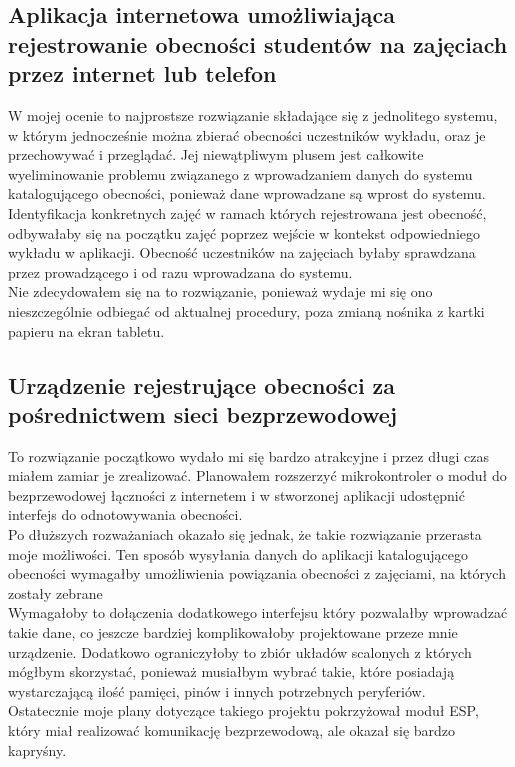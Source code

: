 \documentclass[declaration,shortabstract, mgr]{iithesis}
\begin{document}
\subsection{Aplikacja internetowa umożliwiająca rejestrowanie obecności studentów na zajęciach przez internet lub telefon}
\indent W mojej ocenie to najprostsze rozwiązanie składające się z jednolitego systemu, w którym jednocześnie można zbierać obecności uczestników wykładu, oraz je przechowywać i przeglądać. Jej niewątpliwym plusem jest całkowite wyeliminowanie problemu związanego z wprowadzaniem danych do systemu katalogującego obecności, ponieważ dane wprowadzane są wprost do systemu. Identyfikacja konkretnych zajęć w ramach których rejestrowana jest obecność, odbywałaby się na początku zajęć poprzez wejście w kontekst odpowiedniego wykładu w aplikacji. Obecność uczestników na zajęciach byłaby sprawdzana przez prowadzącego i od razu wprowadzana do systemu. \\
\indent Nie zdecydowałem się na to rozwiązanie, ponieważ wydaje mi się ono nieszczególnie odbiegać od aktualnej procedury, poza zmianą nośnika z kartki papieru na ekran tabletu.

\subsection{Urządzenie rejestrujące obecności za pośrednictwem sieci bezprzewodowej}
\indent To rozwiązanie początkowo wydało mi się bardzo atrakcyjne i przez długi czas miałem zamiar je zrealizować. Planowałem rozszerzyć mikrokontroler o moduł do bezprzewodowej łączności z internetem i w stworzonej aplikacji udostępnić interfejs do odnotowywania obecności. \\
\indent Po dłuższych rozważaniach okazało się jednak, że takie rozwiązanie przerasta moje możliwości. Ten sposób wysyłania danych do aplikacji katalogującego obecności wymagałby umożliwienia powiązania obecności z zajęciami, na których zostały zebrane \\
\indent Wymagałoby to dołączenia dodatkowego interfejsu który pozwalałby wprowadzać takie dane, co jeszcze bardziej komplikowałoby projektowane przeze mnie urządzenie. Dodatkowo ograniczyłoby to zbiór układów scalonych z których mógłbym skorzystać, ponieważ musiałbym wybrać takie, które posiadają wystarczającą ilość pamięci, pinów i innych potrzebnych peryferiów. \\
\indent Ostatecznie moje plany dotyczące takiego projektu pokrzyżował moduł ESP, który miał realizować komunikację bezprzewodową, ale okazał się bardzo kapryśny.
\end{document}
